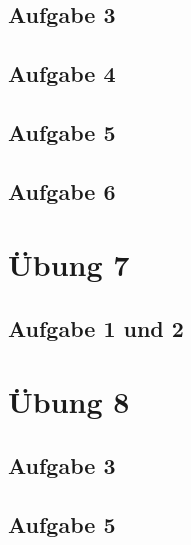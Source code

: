 \documentclass[a4paper,12pt,twoside]{article}
\theoremstyle{definition}
\begin{document}
\subsection{Aufgabe 3}

\subsection{Aufgabe 4}

\subsection{Aufgabe 5}

\subsection{Aufgabe 6}


\newpage
\section{Übung 7}
\subsection{Aufgabe 1 und 2}

		

		

		
		



\newpage
\section{Übung 8}
\subsection{Aufgabe 3}

\subsection{Aufgabe 5}

\end{document}
